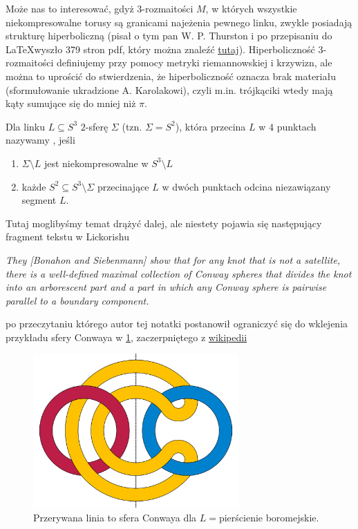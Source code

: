 \documentclass{article}
\begin{document}
Może nas to interesować, gdyż $3$-rozmaitości $M$, w których wszystkie niekompresowalne torusy są granicami najeżenia pewnego linku, zwykle posiadają strukturę hiperboliczną (pisał o tym pan W. P. Thurston i po przepisaniu do \LaTeX wyszło 379 stron pdf, który można znaleźć \href{https://www.math.unl.edu/~jkettinger2/thurston.pdf}{tutaj}). Hiperboliczność $3$-rozmaitości definiujemy przy pomocy metryki riemannowskiej i krzywizn, ale można to uprościć do stwierdzenia, że hiperboliczność oznacza brak materiału (sformułowanie ukradzione A. Karolakowi), czyli m.in. trójkąciki wtedy mają kąty sumujące się do mniej niż $\pi$.

\begin{deff}
  Dla linku $L\subseteq S^3$ $2$-sferę $\Sigma$ (tzn. $\Sigma=S^2$), która przecina $L$ w $4$ punktach nazywamy , jeśli 
  \begin{enumerate}
    \item $\Sigma\setminus L$ jest niekompresowalne w $S^3\setminus L$
    \item każde $S^2\subseteq S^3\setminus \Sigma$ przecinające $L$ w dwóch punktach odcina niezawiązany segment $L$. 
  \end{enumerate}
\end{deff}

Tutaj moglibyśmy temat drążyć dalej, ale niestety pojawia się następujący fragment tekstu w Lickorishu

\begin{adjustwidth}{5cm}{5cm}
\begin{center}
  \slshape 
  They \emph{[Bonahon and Siebenmann]} show that for any knot that is not a
satellite, there is a well-defined maximal collection of Conway spheres that divides
the knot into an arborescent part and a part in which any Conway sphere is pairwise
parallel to a boundary component.
\end{center}
\end{adjustwidth}

po przeczytaniu którego autor tej notatki postanowił ograniczyć się do wklejenia przykładu sfery Conwaya w \cref{conway sphere}, zaczerpniętego z \href{https://en.wikipedia.org/wiki/Conway_sphere#/media/File:Algebraic_Borromean_link_diagram.svg}{wikipedii}
\begin{figure}[h]\centering
  \includegraphics[width=0.7\textwidth]{conway-sphere.png}
  \caption{\label{conway sphere}Przerywana linia to sfera Conwaya dla $L=$pierścienie boromejskie.}
\end{figure}
\end{document}
